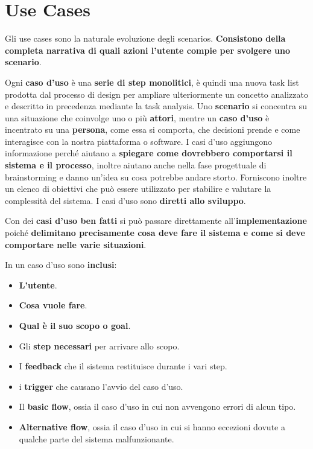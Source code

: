 \section{Use Cases}

Gli use cases sono la naturale evoluzione degli scenarios.
\textbf{Consistono della completa narrativa di quali azioni l'utente compie per svolgere uno scenario}.

Ogni \textbf{caso d'uso} è una \textbf{serie di step monolitici}, è quindi una nuova task list prodotta dal processo di design per ampliare 
ulteriormente un concetto analizzato e descritto in precedenza mediante la task analysis. Uno \textbf{scenario} si concentra su una situazione che
coinvolge uno o più \textbf{attori}, mentre un \textbf{caso d'uso} è incentrato su una \textbf{persona}, come essa si comporta, che decisioni prende
e come interagisce con la nostra piattaforma o software. I casi d'uso aggiungono informazione perché aiutano a \textbf{spiegare come dovrebbero
comportarsi il sistema e il processo}, inoltre aiutano anche nella fase progettuale di brainstorming e danno un'idea su cosa potrebbe andare storto.
Forniscono inoltre un elenco di obiettivi che può essere utilizzato per stabilire e valutare la complessità del sistema. I casi d'uso sono
\textbf{diretti allo sviluppo}.

Con dei \textbf{casi d'uso ben fatti} si può passare direttamente all'\textbf{implementazione} poiché \textbf{delimitano precisamente cosa deve fare
il sistema e come si deve comportare nelle varie situazioni}.

In un caso d'uso sono \textbf{inclusi}:
\begin{itemize}
	\itemsep-0.3em
	\item \textbf{L'utente}.
	\item \textbf{Cosa vuole fare}.
	\item \textbf{Qual è il suo scopo o goal}.
	\item Gli \textbf{step necessari} per arrivare allo scopo.
	\item I \textbf{feedback} che il sistema restituisce durante i vari step.
	\item i \textbf{trigger} che causano l'avvio del caso d'uso.
	\item Il \textbf{basic flow}, ossia il caso d'uso in cui non avvengono errori di alcun tipo.
	\item \textbf{Alternative flow}, ossia il caso d'uso in cui si hanno eccezioni dovute a qualche parte del sistema malfunzionante.
\end{itemize}

